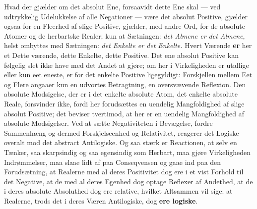 \documentclass[11pt]{book}
\newcommand{\opage}[1]{\marginnote{\footnotesize\textit{[#1]}}}
\begin{document}
Hvad der gjælder om det absolut Ene, forsaavidt dette Ene skal ---
ved udtrykkelig Udelukkelse af alle Negationer --- være det absolut
Positive, gjælder ogsaa for en Fleerhed af slige Positive, gjælder,
med andre Ord, for de absolute Atomer og de herbartske Realer; kun at
Sætningen: \emph{det Almene er det Almene}, helst ombyttes med
Sætningen: \emph{det Enkelte er det Enkelte.} Hvert Værende
\textbf{er} her et Dette\-%
\opage{158} \setcounter{footnote}{0}%
værende, dette Enkelte, dette Positive. Det ene absolut Positive kan
følgelig slet ikke have med det Andet at gjøre; om her i
Virkeligheden er utallige eller kun eet eneste, er for det enkelte
Positive ligegyldigt: Forskjellen mellem Eet og Flere angaaer kun en
udvortes Betragtning, en oversvævende Reflexion. Den absolute
Modsigelse, der er i det enkelte absolute Atom, det enkelte absolute
Reale, forsvinder ikke, fordi her forudsættes en uendelig
Mangfoldighed af slige absolut Positive; det beviser tvertimod, at her
er en uendelig Mangfoldighed af absolute Modsigelser. Ved at sætte
Negativiteten i Bevægelse, fordre Sammenhæng og dermed
Forskjelseenhed og Relativitet, reagerer det Logiske overalt mod det
abstract Antilogiske. Og saa stærk er Reactionen, at selv en Tænker,
saa skarpsindig og saa egensindig som Herbart, maa gjøre Virkeligheden
Indrømmelser, maa slaae lidt af paa Conseqvensen og gaae ind paa den
Forudsætning, at Realerne med al deres Positivitet dog ere i et vist
Forhold til det Negative, at de med al deres Egenhed dog optage
Reflexer af Andethed, at de i deres absolute Absoluthed dog ere
relative, hvilket Altsammen vil sige: at Realerne, trods det i deres
Væren Antilogiske, dog \textbf{ere logiske}.
\end{document}
